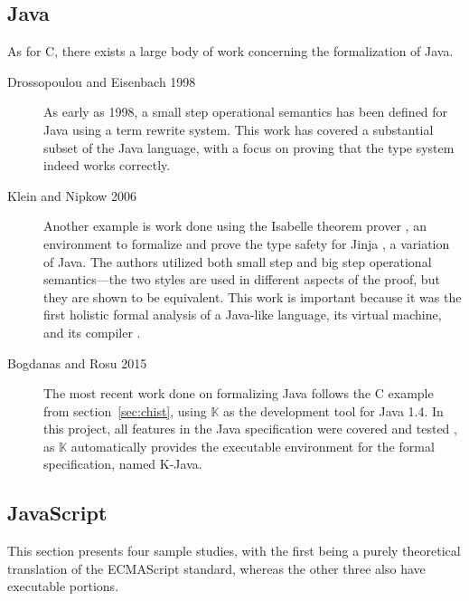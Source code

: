 \documentclass[a4paper,11pt,twoside]{report}
\begin{document}
\subsection{Java}
As for C, there exists a large body of work concerning the formalization of Java. 
\begin{description}
\item[Drossopoulou and Eisenbach 1998] As early as 1998, a small step operational semantics has been defined for Java \cite{drossopoulou1998towards} \cite{Drossopoulou:1999} using a term rewrite system. This work has covered a substantial subset of the Java language, with a focus on proving that the type system indeed works correctly.

\item[Klein and Nipkow 2006] Another example is work done using the Isabelle theorem prover \cite{Paulson1989}, an environment to formalize and prove the type safety for Jinja \cite{KleinN-TOPLAS}, a variation of Java. The authors utilized both small step and big step operational semantics---the two styles are used in different aspects of the proof, but they are shown to be equivalent. This work is important because it was the first holistic formal analysis of a Java-like language, its virtual machine, and its compiler \cite{KleinN-TOPLAS}.

\item[Bogdanas and Rosu 2015] The most recent work done on formalizing Java follows the C example from section~\ref{sec:chist}, using $\mathbb{K}$ as the development tool for Java 1.4. In this project, all features in the Java specification were covered and tested \cite{Bogdanas:2015}, as $\mathbb{K}$ automatically provides the executable environment for the formal specification, named K-Java. 
\end{description}

\subsection{JavaScript}
This section presents four sample studies, with the first being a purely theoretical translation of the ECMAScript standard, whereas the other three also have executable portions.
\end{document}
